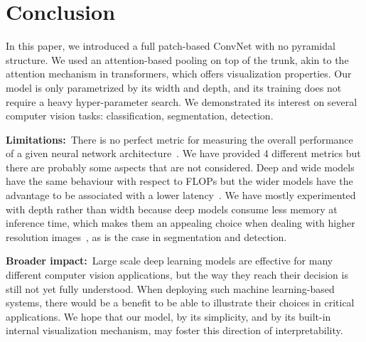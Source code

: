 \section{Conclusion}

In this paper, we introduced a full patch-based ConvNet with no pyramidal structure. %
We used an attention-based pooling on top of the trunk, akin to the attention mechanism in transformers, which offers visualization properties. 
Our model is only parametrized by its width and depth, and its training does not require a heavy hyper-parameter search. %
We demonstrated its interest on several computer vision tasks: classification, segmentation, detection.
\bigskip

\noindent\textbf{Limitations:\,} There is no perfect metric for measuring the overall performance of a given neural network architecture~\cite{Dehghani2021TheEM}. 
We have provided 4 different metrics but there are probably some aspects that are not considered.
Deep and wide models have the same behaviour with respect to FLOPs but the wider models have the advantage to be associated with a lower latency~\cite{Goyal2021NondeepN,Zagoruyko2016WideRN}.
% 
We have mostly experimented with depth rather than width because deep models consume less memory at inference time, which makes them an appealing choice when dealing with higher resolution images~\cite{Bello2021RevisitingRI}, as is the case in segmentation and detection. 

%
\bigskip

%
\noindent\textbf{Broader impact:\,} 
Large scale deep learning models are effective for many different computer vision applications, but the way they reach their decision is still not yet fully understood. When deploying such machine learning-based systems, there would be a benefit to be able to illustrate their choices  in critical applications. We hope that our model, by its simplicity, and by its built-in internal visualization mechanism, may foster this direction of interpretability.  
